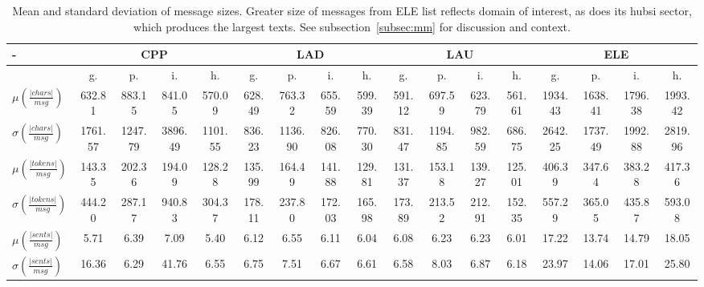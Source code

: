 \documentclass[%
 aip,
 jmp,%
 amsmath,amssymb,
 reprint,%
 floatfix,
]{revtex4-1}
\begin{document}
\begin{table}
  \centering
    \footnotesize
\setlength{\tabcolsep}{.16667em}
  \begin{tabular}{|l|| c|c|c|c||  c|c|c|c||   c|c|c|c||   c|c|c|c|}\hline
-\-  & \multicolumn{4}{c|}{CPP} & \multicolumn{4}{c|}{LAD} & \multicolumn{4}{c|}{LAU} & \multicolumn{4}{c|}{ELE} \\ \hline
 & g. & p. & i. & h. &     g. & p. & i. & h. &    g. & p. & i. & h. &    g. & p. & i. & h. \\\hline
$\mu\left(\frac{|chars|}{msg}\right)$ & 632.81 & 883.15 & 841.05 & 570.09 & 628.49 & 763.32 & 655.59 & 599.39 & 591.12 & 697.59 & 623.79 & 561.61 & 1934.43 & 1638.41 & 1796.38 & 1993.42 \\
$\sigma\left(\frac{|chars|}{msg}\right)$ & 1761.57 & 1247.79 & 3896.49 & 1101.55 & 836.23 & 1136.90 & 826.08 & 770.30 & 831.47 & 1194.85 & 982.59 & 686.75 & 2642.25 & 1737.49 & 1992.88 & 2819.96 \\\hline
$\mu\left(\frac{|tokens|}{msg}\right)$ & 143.35 & 202.36 & 194.09 & 128.28 & 135.99 & 164.49 & 141.88 & 129.81 & 131.37 & 153.18 & 139.27 & 125.01 & 406.39 & 347.64 & 383.28 & 417.36 \\
$\sigma\left(\frac{|tokens|}{msg}\right)$ & 444.20 & 287.17 & 940.83 & 304.37 & 178.11 & 237.80 & 172.03 & 165.98 & 173.89 & 213.52 & 212.91 & 152.35 & 557.29 & 365.05 & 435.87 & 593.08 \\\hline
$\mu\left(\frac{|sents|}{msg}\right)$ & 5.71 & 6.39 & 7.09 & 5.40 & 6.12 & 6.55 & 6.11 & 6.04 & 6.08 & 6.23 & 6.23 & 6.01 & 17.22 & 13.74 & 14.79 & 18.05 \\
$\sigma\left(\frac{|sents|}{msg}\right)$ & 16.36 & 6.29 & 41.76 & 6.55 & 6.75 & 7.51 & 6.67 & 6.61 & 6.58 & 8.03 & 6.87 & 6.18 & 23.97 & 14.06 & 17.01 & 25.80 \\\hline
  \end{tabular}
  \caption{Mean and standard deviation of message sizes. Greater size of messages from ELE list reflects domain of interest, as does its hubsi sector, which produces the largest texts. See subsection~\ref{subsec:mm} for discussion and context.}
  \label{tab:sizesMsgs}
\end{table}
\end{document}
